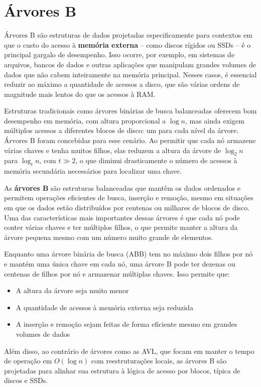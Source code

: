 \chapter{Árvores B}

Árvores B são estruturas de dados projetadas especificamente para contextos em que o custo do acesso à \textbf{memória externa} -- como discos rígidos ou SSDs -- é o principal gargalo de desempenho. 
Isso ocorre, por exemplo, em sistemas de arquivos, bancos de dados e outras aplicações que manipulam grandes volumes de dados que não cabem inteiramente na memória principal. 
Nesses casos, é essencial reduzir ao máximo a quantidade de acessos a disco, que são várias ordens de magnitude mais lentos do que os acessos à RAM.

Estruturas tradicionais como árvores binárias de busca balanceadas oferecem bom desempenho em memória, com altura proporcional a $\log n$, mas ainda exigem múltiplos acessos a diferentes blocos de disco: um para cada nível da árvore. 
Árvores B foram concebidas para esse cenário. 
Ao permitir que cada nó armazene várias chaves e tenha muitos filhos, elas reduzem a altura da árvore de $\log_2 n$ para $\log_t n$, com $t \gg 2$, o que diminui drasticamente o número de acessos à memória secundária necessários para localizar uma chave.

As \textbf{árvores B} são estruturas balanceadas que mantêm os dados ordenados e permitem operações eficientes de busca, inserção e remoção, mesmo em situações em que os dados estão distribuídos por centenas ou milhares de blocos de disco. 
Uma das características mais importantes dessas árvores é que cada nó pode conter várias chaves e ter múltiplos filhos, o que permite manter a altura da árvore pequena mesmo com um número muito grande de elementos.

Enquanto uma árvore binária de busca (ABB) tem no máximo dois filhos por nó e mantém uma única chave em cada nó, uma árvore B pode ter dezenas ou centenas de filhos por nó e armazenar múltiplas chaves. 
Isso permite que:
\begin{itemize}
\item A altura da árvore seja muito menor
\item A quantidade de acessos à memória externa seja reduzida
\item A inserção e remoção sejam feitas de forma eficiente mesmo em grandes volumes de dados
\end{itemize}

Além disso, ao contrário de árvores como as AVL, que focam em manter o tempo de operação em $O(\log n)$ com reestruturações locais, as árvores B são projetadas para alinhar sua estrutura à lógica de acesso por blocos, típica de discos e SSDs. 

